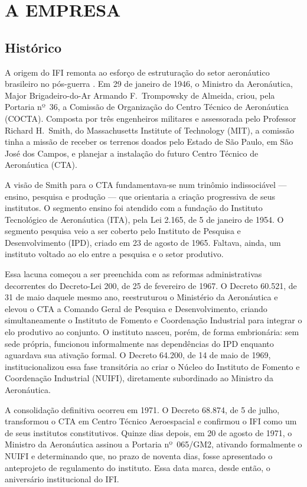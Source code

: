\documentclass[12pt, a4paper]{article}
\begin{document}
\section{A EMPRESA}

\subsection{Histórico}

A origem do IFI remonta ao esforço de estruturação do setor aeronáutico brasileiro no pós-guerra \citep{ifi_historico}. Em 29 de janeiro de 1946, o Ministro da Aeronáutica, Major Brigadeiro-do-Ar Armando F.\ Trompowsky de Almeida, criou, pela Portaria nº~36, a Comissão de Organização do Centro Técnico de Aeronáutica (COCTA). Composta por três engenheiros militares e assessorada pelo Professor Richard H.\ Smith, do Massachusetts Institute of Technology (MIT), a comissão tinha a missão de receber os terrenos doados pelo Estado de São Paulo, em São José dos Campos, e planejar a instalação do futuro Centro Técnico de Aeronáutica (CTA).

A visão de Smith para o CTA fundamentava-se num trinômio indissociável --- ensino, pesquisa e produção --- que orientaria a criação progressiva de seus institutos. O segmento ensino foi atendido com a fundação do Instituto Tecnológico de Aeronáutica (ITA), pela Lei 2.165, de 5 de janeiro de 1954. O segmento pesquisa veio a ser coberto pelo Instituto de Pesquisa e Desenvolvimento (IPD), criado em 23 de agosto de 1965. Faltava, ainda, um instituto voltado ao elo entre a pesquisa e o setor produtivo.

Essa lacuna começou a ser preenchida com as reformas administrativas decorrentes do Decreto-Lei 200, de 25 de fevereiro de 1967. O Decreto 60.521, de 31 de maio daquele mesmo ano, reestruturou o Ministério da Aeronáutica e elevou o CTA a Comando Geral de Pesquisa e Desenvolvimento, criando simultaneamente o Instituto de Fomento e Coordenação Industrial para integrar o elo produtivo ao conjunto. O instituto nasceu, porém, de forma embrionária: sem sede própria, funcionou informalmente nas dependências do IPD enquanto aguardava sua ativação formal. O Decreto 64.200, de 14 de maio de 1969, institucionalizou essa fase transitória ao criar o Núcleo do Instituto de Fomento e Coordenação Industrial (NUIFI), diretamente subordinado ao Ministro da Aeronáutica.

A consolidação definitiva ocorreu em 1971. O Decreto 68.874, de 5 de julho, transformou o CTA em Centro Técnico Aeroespacial e confirmou o IFI como um de seus institutos constitutivos. Quinze dias depois, em 20 de agosto de 1971, o Ministro da Aeronáutica assinou a Portaria nº~065/GM2, ativando formalmente o NUIFI e determinando que, no prazo de noventa dias, fosse apresentado o anteprojeto de regulamento do instituto. Essa data marca, desde então, o aniversário institucional do IFI.
\end{document}
